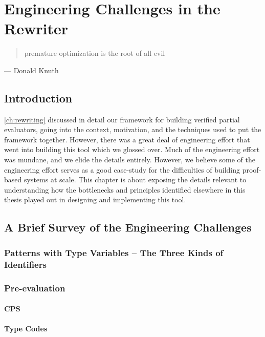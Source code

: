\chapter{Engineering Challenges in the Rewriter} \label{ch:rewriting-more}

\begin{quote}
  premature optimization is the root of all evil
\end{quote}
\begin{flushright}
  --- Donald Knuth
\end{flushright}

\section{Introduction} \label{sec:rewriting-more:intro}
\autoref{ch:rewriting} discussed in detail our framework for building verified partial evaluators, going into the context, motivation, and the techniques used to put the framework together.
However, there was a great deal of engineering effort that went into building this tool which we glossed over.
Much of the engineering effort was mundane, and we elide the details entirely.
However, we believe some of the engineering effort serves as a good case-study for the difficulties of building proof-based systems at scale.
This chapter is about exposing the details relevant to understanding how the bottlenecks and principles identified elsewhere in this thesis played out in designing and implementing this tool.

\section{A Brief Survey of the Engineering Challenges} \label{sec:rewriting-more:challenges-overview}
\subsection{Patterns with Type Variables -- The Three Kinds of Identifiers}
\subsection{Pre-evaluation}
\subsubsection{CPS}
\subsubsection{Type Codes}
